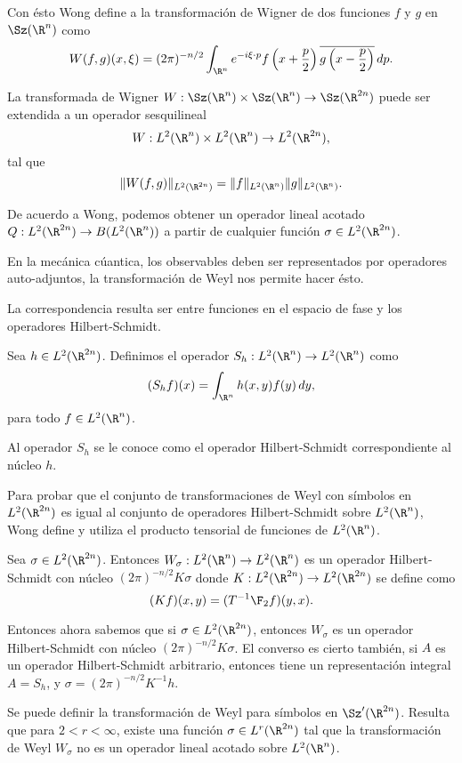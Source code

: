   Con ésto Wong define a la transformación de Wigner de dos
  funciones $f$ y $g$ en $\Sz(\R^{n})$ como
  \begin{equation}
    W(f,g)(x,\xi)
    = (2\pi)^{-n / 2} \int_{\R^{n}} e^{-i\xi \cdot p}
    f\left( x + \frac{p}{2} \right) \overline{g\left( x -
    \frac{p}{2} \right) } \, dp.
  \end{equation}

  La transformada de Wigner $W : \Sz(\R^{n}) \times
  \Sz(\R^{n}) \to \Sz(\R^{2n})$ puede ser extendida a un
  operador sesquilineal
  \[
    W : L^2(\R^{n}) \times L^2(\R^{n}) \to L^2(\R^{2n}),
  \] 
  tal que
  \[
    \|W(f,g)\|_{L^2(\R^{2n})}
    = \|f\|_{L^2(\R^{n})} \|g\|_{L^2(\R^{n})}.
  \] 

  De acuerdo a Wong, podemos obtener un operador lineal
  acotado $Q : L^2(\R^{2n}) \to B(L^2(\R^{n}))$ a partir de
  cualquier función $\sigma \in L^2(\R^{2n})$.

  En la mecánica cúantica, los observables deben ser
  representados por operadores auto-adjuntos, la
  transformación de Weyl nos permite hacer ésto.

  La correspondencia resulta ser entre funciones en el
  espacio de fase y los operadores Hilbert-Schmidt.

  \begin{definition}
    Sea $h \in L^2(\R^{2n})$. Definimos el operador $S_h :
    L^2(\R^{n}) \to L^2(\R^{n})$ como
    \begin{equation}
      (S_hf)(x)
      = \int_{\R^{n}} h(x,y) f(y) \, dy,
    \end{equation}
    para todo $f \in L^2(\R^{n})$.
  \end{definition}
  Al operador $S_h$ se le conoce como el operador
  Hilbert-Schmidt correspondiente al núcleo $h$.

  Para probar que el conjunto de transformaciones de Weyl
  con símbolos en $L^2(\R^{2n})$ es igual al conjunto de
  operadores Hilbert-Schmidt sobre $L^2(\R^{n})$, Wong
  define y utiliza el producto tensorial de funciones de
  $L^2(\R^{n})$.

  \begin{theorem}
    Sea $\sigma \in L^2(\R^{2n})$. Entonces $W_\sigma :
    L^2(\R^{n}) \to L^2(\R^{n})$ es un operador
    Hilbert-Schmidt con núcleo $(2\pi)^{-n / 2}K \sigma$
    donde $K : L^2(\R^{2n}) \to L^2(\R^{2n})$ se define como
    \[
      (Kf)(x,y)
      = (T^{-1}\F_2 f)(y,x).
    \] 
  \end{theorem}

  Entonces ahora sabemos que si $\sigma \in L^2(\R^{2n})$,
  entonces $W_\sigma$ es un operador Hilbert-Schmidt con
  núcleo $(2\pi)^{-n / 2} K \sigma$. El converso es cierto
  también, si $A$ es un operador Hilbert-Schmidt arbitrario,
  entonces tiene un representación integral $A = S_h$, y
  $\sigma = (2\pi)^{-n / 2} K^{-1}h$.

  Se puede definir la transformación de Weyl para símbolos
  en $\Sz'(\R^{2n})$. Resulta que para $2 < r < \infty$,
  existe una función $\sigma \in L^{r}(\R^{2n})$ tal que la
  transformación de Weyl $W_\sigma$ no es un operador lineal
  acotado sobre $L^2(\R^{n})$.
